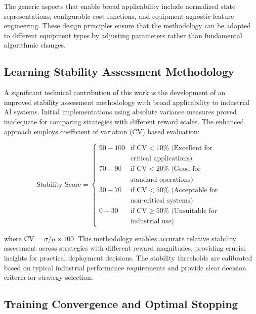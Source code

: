 \documentclass[twocolumn]{article}
\begin{document}
The generic aspects that enable broad applicability include normalized state representations, configurable cost functions, and equipment-agnostic feature engineering. These design principles ensure that the methodology can be adapted to different equipment types by adjusting parameters rather than fundamental algorithmic changes.

\subsection{Learning Stability Assessment Methodology}

A significant technical contribution of this work is the development of an improved stability assessment methodology with broad applicability to industrial AI systems. Initial implementations using absolute variance measures proved inadequate for comparing strategies with different reward scales. The enhanced approach employs coefficient of variation (CV) based evaluation:

\begin{equation}
\text{Stability Score} = 
\begin{cases} 
90-100 & \text{if CV} < 10\% \text{ (Excellent for} \\
& \text{critical applications)} \\
70-90 & \text{if CV} < 20\% \text{ (Good for} \\
& \text{standard operations)} \\
30-70 & \text{if CV} < 50\% \text{ (Acceptable for} \\
& \text{non-critical systems)} \\
0-30 & \text{if CV} \geq 50\% \text{ (Unsuitable for} \\
& \text{industrial use)}
\end{cases}
\end{equation}

where CV = $\sigma/\mu \times 100$. This methodology enables accurate relative stability assessment across strategies with different reward magnitudes, providing crucial insights for practical deployment decisions. The stability thresholds are calibrated based on typical industrial performance requirements and provide clear decision criteria for strategy selection.

\subsection{Training Convergence and Optimal Stopping}
\end{document}
